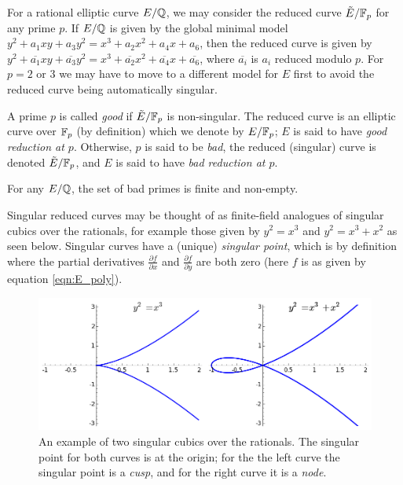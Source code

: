 For a rational elliptic curve $E/\mathbb{Q}$, we may consider the reduced curve $\tilde{E}/\mathbb{F}_p$ for any prime $p$. If $E/\mathbb{Q}$ is given by the global minimal model $y^2 + a_1 xy + a_3 y^2 = x^3 + a_2 x^2 + a_4 x + a_6$, then the reduced curve is given by $y^2 + \overline{a_1} xy + \overline{a_3} y^2 = x^3 + \overline{a_2} x^2 + \overline{a_4} x + \overline{a_6}$, where $\overline{a_i}$ is $a_i$ reduced modulo $p$. For $p = 2$ or $3$ we may have to move to a different model for $E$ first to avoid the reduced curve being automatically singular.

\begin{definition}
A prime $p$ is called {\it good} if $\tilde{E}/\mathbb{F}_p$ is non-singular. The reduced curve is an elliptic curve over $\mathbb{F}_p$ (by definition) which we denote by $E/\mathbb{F}_p$; $E$ is said to have {\it good reduction at $p$}. Otherwise, $p$ is said to be {\it bad}, the reduced (singular) curve is denoted $\tilde{E}/\mathbb{F}_p$, and $E$ is said to have {\it bad reduction at $p$}.
\end{definition}

\begin{theorem}
For any $E/\mathbb{Q}$, the set of bad primes is finite and non-empty.
\end{theorem}

Singular reduced curves may be thought of as finite-field analogues of singular cubics over the rationals, for example those given by $y^2 = x^3$ and $y^2 = x^3+x^2$ as seen below. Singular curves have a (unique) {\it singular point}, which is by definition where the partial derivatives $\frac{\partial f}{\partial x}$ and $\frac{\partial f}{\partial y}$ are both zero (here $f$ is as given by equation \ref{eqn:E_poly}).

\begin{figure}[!h]
    \centering
    \includegraphics[width=1.0\textwidth]{graphics/singular_cubics.png}
    \caption{An example of two singular cubics over the rationals. The singular point for both curves is at the origin; for the the left curve the singular point is a {\it cusp}, and for the right curve it is a {\it node}.}
    \label{fig:singular_cubics}
\end{figure}

